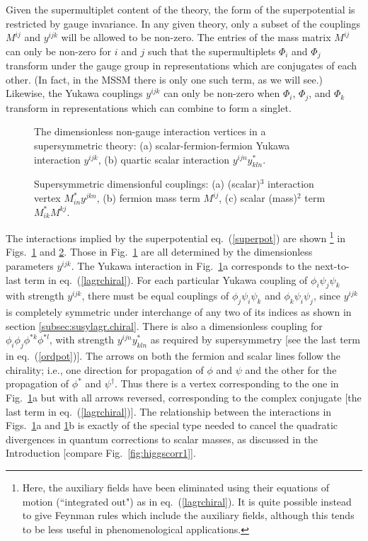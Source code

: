 Given the supermultiplet content of the theory, the form of the
superpotential is restricted by gauge invariance. In any given theory,
only a subset of the
couplings $M^{ij}$ and $y^{ijk}$ will be allowed to be non-zero. The 
entries of the mass
matrix $M^{ij}$
can only be non-zero for $i$ and $j$ such that the supermultiplets
$\Phi_i$ and $\Phi_j$
transform under the gauge group in representations which are
conjugates of each other. (In fact,
in the MSSM there is only one
such term, as we will see.)
Likewise, the Yukawa couplings $y^{ijk}$ can only be non-zero
when $\Phi_i$, $\Phi_j$, and $\Phi_k$ transform in representations which
can combine to form a singlet.

\begin{figure}
\centerline{}
\caption{The dimensionless non-gauge interaction vertices
in a supersymmetric theory: (a) scalar-fermion-fermion Yukawa
interaction $y^{ijk}$, (b) quartic scalar interaction $y^{ijn}y^*_{kln}$.
\label{fig:dim0}}
\end{figure}
\begin{figure}
\centerline{}
\caption{Supersymmetric dimensionful couplings: (a)
(scalar)$^3$ interaction vertex $M^*_{in} y^{jkn}$, (b)
fermion mass
term $M^{ij}$, (c) scalar (mass)$^2$ term $M^*_{ik}M^{kj}$.
\label{fig:dim12}}
\end{figure}
The interactions implied by the superpotential eq.~(\ref{superpot})
are shown \footnote{Here, the auxiliary fields have been eliminated using
their equations of motion
(``integrated out") as in eq.~(\ref{lagrchiral}).
It is quite possible instead to give Feynman
rules which include the auxiliary fields, although this tends to be
less useful in phenomenological applications.} in
Figs.~\ref{fig:dim0} and \ref{fig:dim12}.
Those in Fig.~\ref{fig:dim0} are all
determined by the dimensionless parameters $y^{ijk}$.
The Yukawa interaction in Fig.~\ref{fig:dim0}a corresponds to the
next-to-last
term in eq.~(\ref{lagrchiral}). For
each particular Yukawa coupling of $\phi_i \psi_j \psi_k$ with
strength $y^{ijk}$,
there must be equal couplings of $\phi_j \psi_i \psi_k$ and $\phi_k
\psi_i \psi_j$, since $y^{ijk}$ is completely symmetric under interchange
of any two of its indices as shown in section
\ref{subsec:susylagr.chiral}.
There is also a dimensionless coupling for
$\phi_i \phi_j \phi^{*k}\phi^{*l}$, with strength $y^{ijn} y^*_{kln}$
as required by supersymmetry [see the last term in eq.~(\ref{ordpot})].
The arrows on both the fermion and scalar
lines follow the chirality;
i.e., one direction for propagation of $\phi$
and $\psi$ and the other for the propagation of $\phi^*$ and
$\psi^\dagger$. Thus there is a vertex corresponding to the
one in Fig.~\ref{fig:dim0}a but with all arrows reversed, corresponding to
the
complex conjugate [the last term in eq.~(\ref{lagrchiral})].
The relationship between the interactions in Figs.~\ref{fig:dim0}a and
\ref{fig:dim0}b is
exactly of the special type needed to cancel the quadratic divergences in
quantum corrections to scalar masses, as discussed in the Introduction
[compare Fig.~\ref{fig:higgscorr1}].

